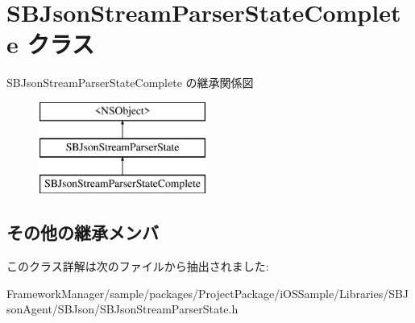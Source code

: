 \hypertarget{interface_s_b_json_stream_parser_state_complete}{}\section{S\+B\+Json\+Stream\+Parser\+State\+Complete クラス}
\label{interface_s_b_json_stream_parser_state_complete}
S\+B\+Json\+Stream\+Parser\+State\+Complete の継承関係図\begin{figure}[H]
\begin{center}
\leavevmode
\includegraphics[height=3.000000cm]{interface_s_b_json_stream_parser_state_complete}
\end{center}
\end{figure}
\subsection*{その他の継承メンバ}


このクラス詳解は次のファイルから抽出されました\+:\begin{DoxyCompactItemize}
\item 
Framework\+Manager/sample/packages/\+Project\+Package/i\+O\+S\+Sample/\+Libraries/\+S\+B\+Json\+Agent/\+S\+B\+Json/S\+B\+Json\+Stream\+Parser\+State.\+h\end{DoxyCompactItemize}
